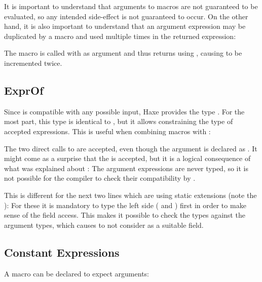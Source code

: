 It is important to understand that arguments to macros are not guaranteed to be evaluated, so any intended side-effect is not guaranteed to occur. On the other hand, it is also important to understand that an argument expression may be duplicated by a macro and used multiple times in the returned expression:


The macro  is called with  as argument and thus returns  using , causing  to be incremented twice.

\subsection{ExprOf}
\label{macro-ExprOf}

Since  is compatible with any possible input, Haxe provides the type . For the most part, this type is identical to , but it allows constraining the type of accepted expressions. This is useful when combining macros with :


The two direct calls to  are accepted, even though the argument is declared as . It might come as a surprise that the   is accepted, but it is a logical consequence of what was explained about : The argument expressions are never typed, so it is not possible for the compiler to check their compatibility by .

This is different for the next two lines which are using static extensions (note the ): For these it is mandatory to type the left side ( and ) first in order to make sense of the  field access. This makes it possible to check the types against the argument types, which causes  to not consider  as a suitable field.

\subsection{Constant Expressions}
\label{macro-constant-arguments}

A macro can be declared to expect  arguments:

